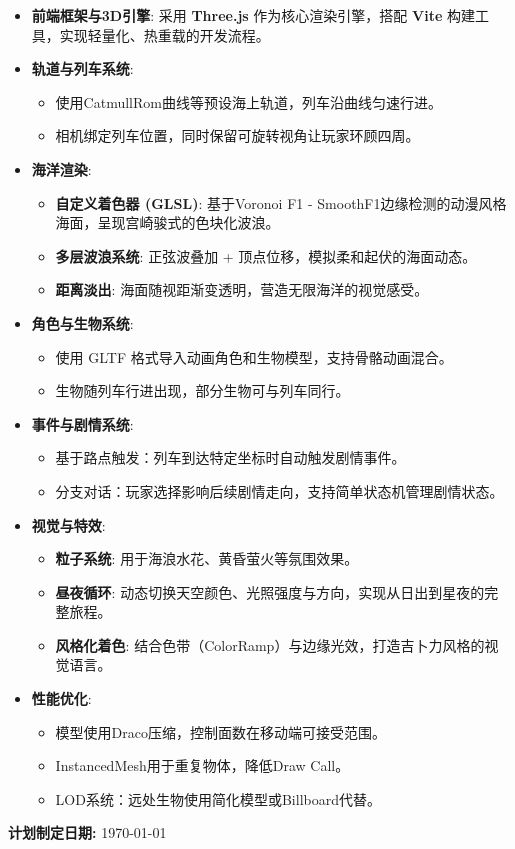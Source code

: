 \documentclass[a4paper, 12pt]{article}
\newcommand{\projectitem}[1]{\item \textbf{#1}:}
\begin{document}
\begin{itemize}
    \projectitem{前端框架与3D引擎}
    采用 \textbf{Three.js} 作为核心渲染引擎，搭配 \textbf{Vite} 构建工具，实现轻量化、热重载的开发流程。

    \projectitem{轨道与列车系统}
    \begin{itemize}
        \item 使用CatmullRom曲线等预设海上轨道，列车沿曲线匀速行进。
        \item 相机绑定列车位置，同时保留可旋转视角让玩家环顾四周。
    \end{itemize}

    \projectitem{海洋渲染}
    \begin{itemize}
        \item \textbf{自定义着色器 (GLSL)}: 基于Voronoi F1 - SmoothF1边缘检测的动漫风格海面，呈现宫崎骏式的色块化波浪。
        \item \textbf{多层波浪系统}: 正弦波叠加 + 顶点位移，模拟柔和起伏的海面动态。
        \item \textbf{距离淡出}: 海面随视距渐变透明，营造无限海洋的视觉感受。
    \end{itemize}

    \projectitem{角色与生物系统}
    \begin{itemize}
        \item 使用 GLTF 格式导入动画角色和生物模型，支持骨骼动画混合。
        \item 生物随列车行进出现，部分生物可与列车同行。
    \end{itemize}

    \projectitem{事件与剧情系统}
    \begin{itemize}
        \item 基于路点触发：列车到达特定坐标时自动触发剧情事件。
        \item 分支对话：玩家选择影响后续剧情走向，支持简单状态机管理剧情状态。
    \end{itemize}

    \projectitem{视觉与特效}
    \begin{itemize}
        \item \textbf{粒子系统}: 用于海浪水花、黄昏萤火等氛围效果。
        \item \textbf{昼夜循环}: 动态切换天空颜色、光照强度与方向，实现从日出到星夜的完整旅程。
        \item \textbf{风格化着色}: 结合色带（ColorRamp）与边缘光效，打造吉卜力风格的视觉语言。
    \end{itemize}

    \projectitem{性能优化}
    \begin{itemize}
        \item 模型使用Draco压缩，控制面数在移动端可接受范围。
        \item InstancedMesh用于重复物体，降低Draw Call。
        \item LOD系统：远处生物使用简化模型或Billboard代替。
    \end{itemize}
\end{itemize}

\vspace{2cm}

\begin{flushright}
    \textbf{计划制定日期:} \today
\end{flushright}
\end{document}
